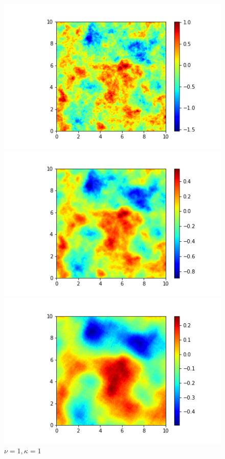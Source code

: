 \documentclass{article}
\begin{document}
\begin{figure}[H]
    \centering
\begin{minipage}[t]{0.3\textwidth}  %
    \centering
    \includegraphics[width=\textwidth]{./pics/2D_NeuralRF_256_10.0_0.5_1.png}  %
    \caption*{$\nu=0.5, \kappa=1$}
  \end{minipage}
  \begin{minipage}[t]{0.3\textwidth} 
    \centering
    \includegraphics[width=\textwidth]{./pics/2D_NeuralRF_256_10.0_1_1.png} 
    \caption*{$\nu=1, \kappa=1$}
  \end{minipage}
  \begin{minipage}[t]{0.3\textwidth}
    \centering
    \includegraphics[width=\textwidth]{./pics/2D_NeuralRF_256_10.0_2_1.png}  %

\end{minipage}
\end{figure}
\end{document}
